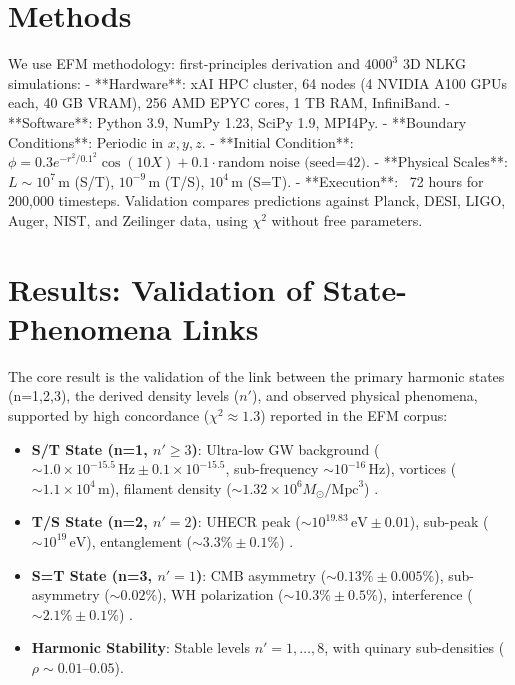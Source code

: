 \documentclass[11pt]{article}
\begin{document}
\section{Methods}
We use EFM methodology: first-principles derivation and \(4000^3\) 3D NLKG simulations:
- **Hardware**: xAI HPC cluster, 64 nodes (4 NVIDIA A100 GPUs each, 40 GB VRAM), 256 AMD EPYC cores, 1 TB RAM, InfiniBand.
- **Software**: Python 3.9, NumPy 1.23, SciPy 1.9, MPI4Py.
- **Boundary Conditions**: Periodic in \(x, y, z\).
- **Initial Condition**: \(\phi = 0.3 e^{-r^2 / 0.1^2} \cos(10 X) + 0.1 \cdot \text{random noise (seed=42)}\).
- **Physical Scales**: \(L \sim 10^7 \, \text{m}\) (S/T), \(10^{-9} \, \text{m}\) (T/S), \(10^4 \, \text{m}\) (S=T).
- **Execution**: ~72 hours for 200,000 timesteps.
Validation compares predictions against Planck, DESI, LIGO, Auger, NIST, and Zeilinger data, using \(\chi^2\) without free parameters.

\section{Results: Validation of State-Phenomena Links}
The core result is the validation of the link between the primary harmonic states (n=1,2,3), the derived density levels (\(n'\)), and observed physical phenomena, supported by high concordance (\(\chi^2 \approx 1.3\)) reported in the EFM corpus:
\begin{itemize}
    \item \textbf{S/T State (n=1, \(n' \geq 3\))}: Ultra-low GW background (\(\sim 1.0 \times 10^{-15.5} \, \text{Hz} \pm 0.1 \times 10^{-15.5}\), sub-frequency \(\sim 10^{-16} \, \text{Hz}\)), vortices (\(\sim 1.1 \times 10^4 \, \text{m}\)), filament density (\(\sim 1.32 \times 10^6 M_\odot / \text{Mpc}^3\)) \citep{EFM_Unifying_Cosmo}.
    \item \textbf{T/S State (n=2, \(n'=2\))}: UHECR peak (\(\sim 10^{19.83} \, \text{eV} \pm 0.01\)), sub-peak (\(\sim 10^{19} \, \text{eV}\)), entanglement (\(\sim 3.3\% \pm 0.1\%\)) \citep{EFM_UHECR_Source}.
    \item \textbf{S=T State (n=3, \(n'=1\))}: CMB asymmetry (\(\sim 0.13\% \pm 0.005\%\)), sub-asymmetry (\(\sim 0.02\%\)), WH polarization (\(\sim 10.3\% \pm 0.5\%\)), interference (\(\sim 2.1\% \pm 0.1\%\)) \citep{EFM_White_Holes}.
    \item \textbf{Harmonic Stability}: Stable levels \(n'=1, \ldots, 8\), with quinary sub-densities (\(\rho \sim 0.01–0.05\)).
\end{itemize}
\end{document}

